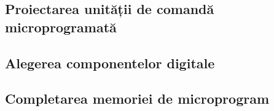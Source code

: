 \documentclass[a4paper,12pt]{article}
\begin{document}
\subsection{Proiectarea unității de comandă microprogramată}


\subsection{Alegerea componentelor digitale}


\subsection{Completarea memoriei de microprogram}

\end{document}
